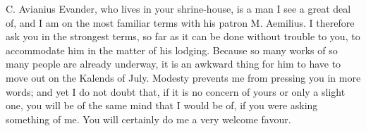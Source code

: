 

 C. Avianius Evander, who lives in your shrine-house, is a man I see a great deal of, and I am on the most familiar terms with his patron M. Aemilius. I therefore ask you in the strongest terms, so far as it can be done without trouble to you, to accommodate him in the matter of his lodging. Because so many works of so many people are already underway, it is an awkward thing for him to have to move out on the Kalends of July. Modesty prevents me from pressing you in more words; and yet I do not doubt that, if it is no concern of yours or only a slight one, you will be of the same mind that I would be of, if you were asking something of me. You will certainly do me a very welcome favour.
